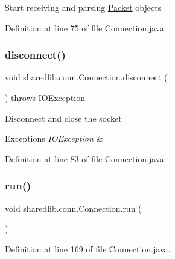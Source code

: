 Start receiving and parsing \hyperlink{classsharedlib_1_1conn_1_1_packet}{Packet} objects 

Definition at line 75 of file Connection.\+java.

\hypertarget{classsharedlib_1_1conn_1_1_connection_a37b7b6a7358ebbc17c346dde8ffef9c1}{}\label{classsharedlib_1_1conn_1_1_connection_a37b7b6a7358ebbc17c346dde8ffef9c1} 
\subsubsection{\texorpdfstring{disconnect()}{disconnect()}}
{\footnotesize\ttfamily void sharedlib.\+conn.\+Connection.\+disconnect (\begin{DoxyParamCaption}{ }\end{DoxyParamCaption}) throws I\+O\+Exception}

Disconnect and close the socket 
\begin{DoxyExceptions}{Exceptions}
{\em I\+O\+Exception} & \\
\hline
\end{DoxyExceptions}


Definition at line 83 of file Connection.\+java.

\hypertarget{classsharedlib_1_1conn_1_1_connection_a0badcffcade5330b1466a3b9cf60aee2}{}\label{classsharedlib_1_1conn_1_1_connection_a0badcffcade5330b1466a3b9cf60aee2} 
\subsubsection{\texorpdfstring{run()}{run()}}
{\footnotesize\ttfamily void sharedlib.\+conn.\+Connection.\+run (\begin{DoxyParamCaption}{ }\end{DoxyParamCaption})}



Definition at line 169 of file Connection.\+java.

\hypertarget{classsharedlib_1_1conn_1_1_connection_aec31a2fdc2ff6297d1906e1a70726571}{}\label{classsharedlib_1_1conn_1_1_connection_aec31a2fdc2ff6297d1906e1a70726571} 
